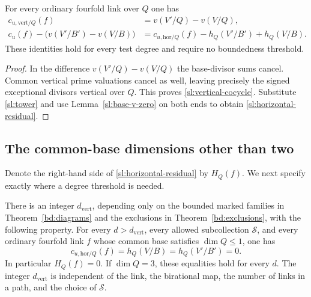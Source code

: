 \begin{proposition}
\label{sl:vertical}
For every ordinary fourfold link over $Q$ one has
\begin{align}
\label{sl:vertical-cocycle}
 c_{u,\mathrm{vert}/Q}(f)&=v(V'/Q)-v(V/Q),\\
\label{sl:horizontal-residual}
 c_u(f)-\bigl(v(V'/B')-v(V/B)\bigr)
 &=c_{u,\mathrm{hor}/Q}(f)-h_Q(V'/B')+h_Q(V/B).
\end{align}
These identities hold for every test degree and require no
boundedness threshold.
\end{proposition}

\begin{proof}
In the difference $v(V'/Q)-v(V/Q)$ the base-divisor sums cancel.
Common vertical prime valuations cancel as well, leaving precisely
the signed exceptional divisors vertical over $Q$.  This proves
\eqref{sl:vertical-cocycle}.  Substitute \eqref{sl:tower} and use
Lemma~\ref{sl:base-v-zero} on both ends to obtain
\eqref{sl:horizontal-residual}.
\end{proof}

\subsection{The common-base dimensions other than two}

Denote the right-hand side of \eqref{sl:horizontal-residual} by
$H_Q(f)$.  We next specify exactly where a degree threshold is needed.

\begin{proposition}
\label{sl:low-base}
There is an integer $d_{\mathrm{vert}}$, depending only on the bounded
marked families in Theorem~\ref{bd:diagrams} and the exclusions in
Theorem~\ref{bd:exclusions}, with the following property.  For every
$d>d_{\mathrm{vert}}$, every allowed subcollection $\mathcal S$, and
every ordinary fourfold link $f$ whose common base satisfies
$\dim Q\le1$, one has
\[
 c_{u,\mathrm{hor}/Q}(f)=h_Q(V/B)=h_Q(V'/B')=0.
\]
In particular $H_Q(f)=0$.  If $\dim Q=3$, these equalities hold for
every $d$.  The integer $d_{\mathrm{vert}}$ is independent of the link,
the birational map, the number of links in a path, and the choice of
$\mathcal S$.
\end{proposition}

